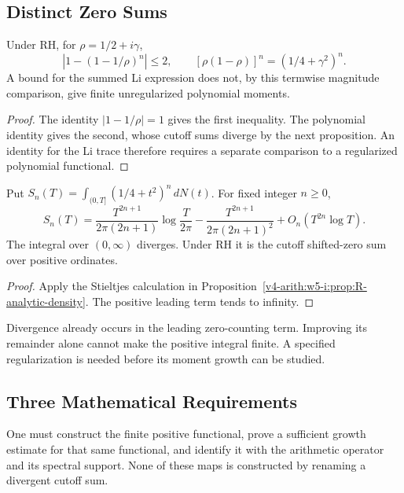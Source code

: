 \subsection{Distinct Zero Sums}
\label{v4-arith:r-comparison:can-BL-sharpen}
\begin{proposition}
\label{v4-arith:r-comparison:prop:BL-vs-mu}
Under RH, for \(\rho=1/2+i\gamma\),
\[
 |1-(1-1/\rho)^n|\leq2,\qquad
 [\rho(1-\rho)]^n=(1/4+\gamma^2)^n.
\]
A bound for the summed Li expression does not, by this termwise
magnitude comparison, give finite unregularized polynomial moments.
\end{proposition}
\begin{proof}
The identity \(|1-1/\rho|=1\) gives the first inequality.
The polynomial identity gives the second, whose cutoff sums diverge
by the next proposition. An identity for the Li trace therefore
requires a separate comparison to a regularized polynomial functional.
\end{proof}
\begin{proposition}
\label{v4-arith:r-comparison:prop:closing-gap-is-density-RH}
Put \(S_n(T)=\int_{(0,T]}(1/4+t^2)^n\,dN(t)\). For fixed
integer \(n\geq0\),
\[
 S_n(T)=\frac{T^{2n+1}}{2\pi(2n+1)}\log\frac{T}{2\pi}
 -\frac{T^{2n+1}}{2\pi(2n+1)^2}+O_n(T^{2n}\log T).
\]
The integral over \((0,\infty)\) diverges. Under RH it is the
cutoff shifted-zero sum over positive ordinates.
\end{proposition}
\begin{proof}
Apply the Stieltjes calculation in
Proposition~\ref{v4-arith:w5-i:prop:R-analytic-density}.
The positive leading term tends to infinity.
\end{proof}
\begin{remark}
\label{v4-arith:r-comparison:rem:form-vs-difficulty}
Divergence already occurs in the leading zero-counting term.
Improving its remainder alone cannot make the positive integral
finite. A specified regularization is needed before its moment
growth can be studied.
\end{remark}
\subsection{Three Mathematical Requirements}
\label{v4-arith:r-comparison:axis-distinction}
One must construct the finite positive functional, prove a sufficient
growth estimate for that same functional, and identify it with the
arithmetic operator and its spectral support. None of these maps is
constructed by renaming a divergent cutoff sum.

